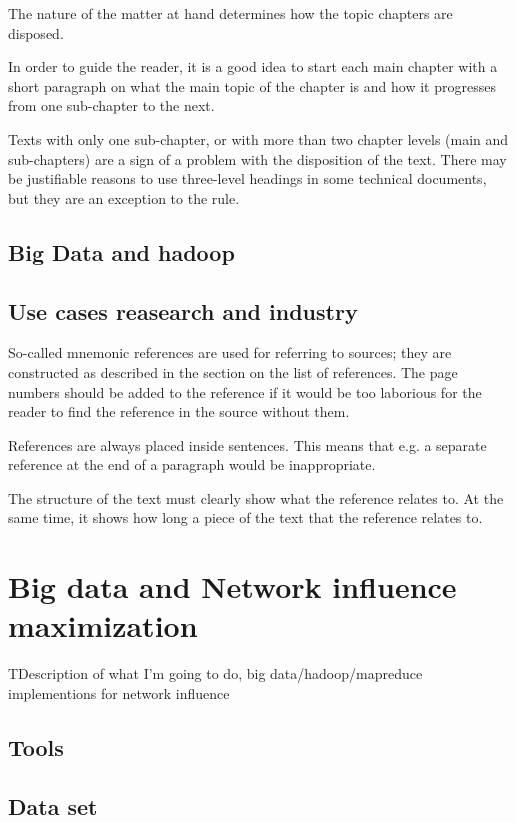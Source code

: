 \documentclass[english]{tktltiki}
\begin{document}
The nature of the matter at hand determines how the topic chapters are disposed.

In order to guide the reader, it is a good idea to start each main chapter with a short paragraph 
on what the main topic of the chapter is and how it progresses from one sub-chapter to the next.

Texts with only one sub-chapter, or with more than two chapter levels (main and sub-chapters) are a 
sign of a problem with the disposition of the text. There may be justifiable reasons to use three-level 
headings in some technical documents, but they are an exception to the rule.

\subsection{Big Data and hadoop}

\subsection{Use cases reasearch and industry}


So-called mnemonic references are used for referring to sources; they are constructed as described 
in the section on the list of references. The page numbers should be added to the reference if it would 
be too laborious for the reader to find the reference in the source without them. 

References are always placed inside sentences.  This means that e.g. a separate reference at the end of a paragraph would be inappropriate.

The structure of the text must clearly show what the reference relates to.  At the same time, it 
shows how long a piece of the text that the reference relates to.


\section{Big data and Network influence maximization}

TDescription of what I'm going to do, big data/hadoop/mapreduce implementions for network influence


\subsection{Tools}




\subsection{Data set}
\end{document}
